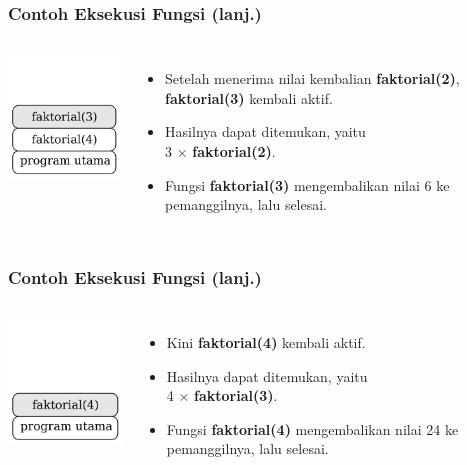 \begin{frame}
\frametitle{Contoh Eksekusi Fungsi (lanj.)}
\begin{columns}
    \centering
    \includegraphics[width=4cm]{asset/rekursi-3.pdf}
    \begin{itemize}
      \item Setelah menerima nilai kembalian \textbf{faktorial(2)}, \textbf{faktorial(3)} kembali aktif.
      \item Hasilnya dapat ditemukan, yaitu \\ 3 $\times$ \textbf{faktorial(2)}.
      \item Fungsi \textbf{faktorial(3)} mengembalikan nilai 6 ke pemanggilnya, lalu selesai.
    \end{itemize}
  \end{columns} 
\end{frame}

\begin{frame}
\frametitle{Contoh Eksekusi Fungsi (lanj.)}
\begin{columns}
    \centering
    \includegraphics[width=4cm]{asset/rekursi-2.pdf}
    \begin{itemize}
      \item Kini \textbf{faktorial(4)} kembali aktif.
      \item Hasilnya dapat ditemukan, yaitu \\ 4 $\times$ \textbf{faktorial(3)}.
      \item Fungsi \textbf{faktorial(4)} mengembalikan nilai 24 ke pemanggilnya, lalu selesai.
    \end{itemize}
  \end{columns} 
\end{frame}

